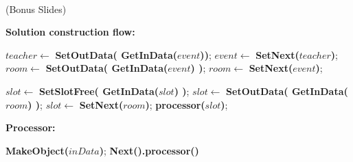 \documentclass[centering]{report}
\newenvironment{slide}
    {\newpage
    \vspace*{\fill}
    }
    { 
     \vspace*{\fill}
    }
\begin{document}
\begin{frame}\\
  
  \large{}
\end{frame}

\begin{slide}
(Bonus Slides)
\end{slide}


\begin{slide}
\textbf{Solution construction flow:}\\
{\huge
  \begin{algorithmic}[1]

    \State $teacher \gets $ \textbf{SetOutData( \textbf{GetInData($event$)})};
    \State $event \gets $ \textbf{SetNext($teacher$)};
    \State $room \gets $ \textbf{SetOutData( \textbf{GetInData($event$)} )};
    \State $room \gets $ \textbf{SetNext($event$)};

    \State $slot \gets $ \textbf{SetSlotFree( \textbf{GetInData($slot$)} )};
    \State $slot \gets $ \textbf{SetOutData( \textbf{GetInData($room$)} )};
    \State $slot \gets $ \textbf{SetNext($room$)};
    \State \textbf{processor($slot$)};

    \EndProcedure
  \end{algorithmic}
}
\end{slide}


\begin{slide}
\textbf{Processor:}\\
{\huge
  \begin{algorithmic}[1]

    \State \textbf{MakeObject($inData$)};
      \State \textbf{Next().processor()}
    \EndIf
    \EndProcedure
  \end{algorithmic}
}
\end{slide}
\end{document}
